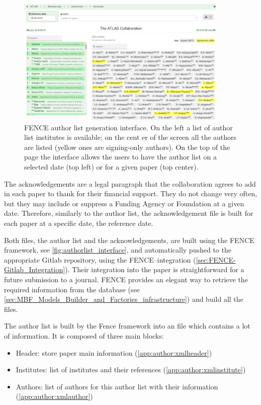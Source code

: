 \begin{figure}[htb]
  \centering
  \includegraphics[width=0.9\textwidth]{figures/authorlist_generation.png}
  \caption{FENCE author list generation interface. On the left a list of author list institutes is available; on the cent er of the screen all the authors are listed (yellow ones are signing-only  authors). On the top of the page the interface allows the users to have the author list on a selected date (top left) or for a given paper (top center).}%
  \label{fig:authorlist_generation}
\end{figure}

The acknowledgements are a legal paragraph that the collaboration agrees to add in each paper to thank for their financial support.
They do not change very often, but they may include or suppress a Funding Agency or Foundation at a given date.
Therefore, similarly to the author list, the acknowledgement file is built for each paper at a specific date, the reference date.

Both files, the author list and the acknowledgements, are built using the FENCE framework, see \cref{fig:authorlist_interface},
and automatically pushed to the appropriate Gitlab repository, using the FENCE--\gitlab integration (\cref{sec:FENCE-Gitlab_Integration}).
Their integration into the paper is straightforward for a future submission to a journal.
FENCE provides an elegant way to retrieve the required information from the database (see \cref{sec:MBF_Models_Builder_and_Factories_infrastructure}) and build all the files.

The author list is built by the Fence framework into an  file which contains a lot of information. It is composed of three main blocks:
\begin{itemize}
\item Header: store paper main information (\cref{app:author:xmlheader})
\item Institutes: list of institutes and their references (\cref{app:author:xmlinstitute})
\item Authors: list of authors for this author list with their information (\cref{app:author:xmlauthor})
\end{itemize}

